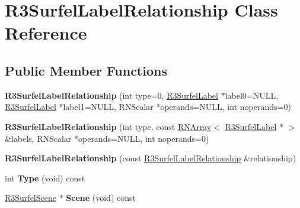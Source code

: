 \hypertarget{class_r3_surfel_label_relationship}{}\section{R3\+Surfel\+Label\+Relationship Class Reference}
\label{class_r3_surfel_label_relationship}
\subsection*{Public Member Functions}
\begin{DoxyCompactItemize}
\item 
{\bfseries R3\+Surfel\+Label\+Relationship} (int type=0, \hyperlink{class_r3_surfel_label}{R3\+Surfel\+Label} $\ast$label0=N\+U\+LL, \hyperlink{class_r3_surfel_label}{R3\+Surfel\+Label} $\ast$label1=N\+U\+LL, R\+N\+Scalar $\ast$operands=N\+U\+LL, int noperands=0)\hypertarget{class_r3_surfel_label_relationship_a6923d902057d3ef9d19a521435aa8bfc}{}\label{class_r3_surfel_label_relationship_a6923d902057d3ef9d19a521435aa8bfc}

\item 
{\bfseries R3\+Surfel\+Label\+Relationship} (int type, const \hyperlink{class_r_n_array}{R\+N\+Array}$<$ \hyperlink{class_r3_surfel_label}{R3\+Surfel\+Label} $\ast$ $>$ \&labels, R\+N\+Scalar $\ast$operands=N\+U\+LL, int noperands=0)\hypertarget{class_r3_surfel_label_relationship_ab066ff8d9a3ba4429d7cbb70747325db}{}\label{class_r3_surfel_label_relationship_ab066ff8d9a3ba4429d7cbb70747325db}

\item 
{\bfseries R3\+Surfel\+Label\+Relationship} (const \hyperlink{class_r3_surfel_label_relationship}{R3\+Surfel\+Label\+Relationship} \&relationship)\hypertarget{class_r3_surfel_label_relationship_ac9ce4496a49c3ced8d3b118d449d7ca7}{}\label{class_r3_surfel_label_relationship_ac9ce4496a49c3ced8d3b118d449d7ca7}

\item 
int {\bfseries Type} (void) const \hypertarget{class_r3_surfel_label_relationship_a0d058eda773d14cd611ed22105590a7f}{}\label{class_r3_surfel_label_relationship_a0d058eda773d14cd611ed22105590a7f}

\item 
\hyperlink{class_r3_surfel_scene}{R3\+Surfel\+Scene} $\ast$ {\bfseries Scene} (void) const \hypertarget{class_r3_surfel_label_relationship_a064d12e58b752dd8b096ca9cfc24ce77}{}\label{class_r3_surfel_label_relationship_a064d12e58b752dd8b096ca9cfc24ce77}


\end{DoxyCompactItemize}
